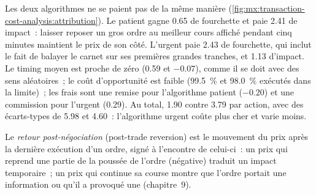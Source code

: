 \begin{omfigure}

\label{fig:mx:transaction-cost-analysis:attribution}
\end{omfigure}

Les deux algorithmes ne se paient pas de la même manière (\cref{fig:mx:transaction-cost-analysis:attribution}). Le patient gagne 0.65  de fourchette et paie 2.41 de
impact~: laisser reposer un gros ordre au meilleur cours affiché pendant cinq minutes maintient le prix de son côté. L'urgent paie 2.43 de fourchette, qui inclut le fait de balayer
le carnet sur ses premières grandes tranches, et 1.13 d'impact. Le timing moyen est proche de zéro (0.59 et $-0.07$), comme il se doit avec des sens aléatoires~; le coût d'opportunité est
faible (99.5~\% et 98.0~\% exécutés dans la limite)~; les frais sont une remise pour l'algorithme patient ($-0.20$) et une commission pour l'urgent (0.29). Au
total, 1.90 contre 3.79  par action, avec des écarts-types de 5.98 et 4.60~: l'algorithme urgent coûte plus cher et varie moins.

\begin{definition}\label{def:mx:transaction-cost-analysis:reversion}
Le \emph{retour post-négociation} (post-trade reversion) est le mouvement du prix après la dernière exécution d'un ordre, signé à l'encontre de celui-ci~: un prix qui
reprend une partie de la poussée de l'ordre (négative) traduit un impact temporaire~; un prix qui continue sa course montre que l'ordre portait une information ou qu'il a provoqué une
 (chapitre~9).
\end{definition}

